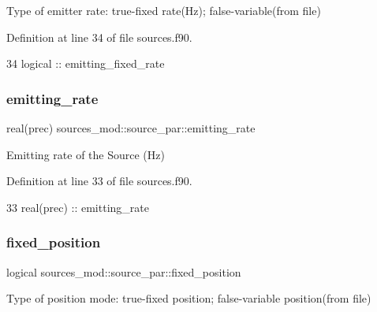 Type of emitter rate\+: true-\/fixed rate(\+Hz); false-\/variable(from file) 



Definition at line 34 of file sources.\+f90.


\begin{DoxyCode}
34         \textcolor{keywordtype}{logical} :: emitting\_fixed\_rate
\end{DoxyCode}
\mbox{\label{structsources__mod_1_1source__par_a8374d8f2d32dfa9e9f5863c7a45d0e1d}} 
\subsubsection{\texorpdfstring{emitting\+\_\+rate}{emitting\_rate}}
{\footnotesize\ttfamily real(prec) sources\+\_\+mod\+::source\+\_\+par\+::emitting\+\_\+rate\hspace{0.3cm}{\ttfamily [private]}}



Emitting rate of the Source (Hz) 



Definition at line 33 of file sources.\+f90.


\begin{DoxyCode}
33         \textcolor{keywordtype}{real(prec)} :: emitting\_rate
\end{DoxyCode}
\mbox{\label{structsources__mod_1_1source__par_a2c373733307ac5dca0f581aea21e9e03}} 
\subsubsection{\texorpdfstring{fixed\+\_\+position}{fixed\_position}}
{\footnotesize\ttfamily logical sources\+\_\+mod\+::source\+\_\+par\+::fixed\+\_\+position\hspace{0.3cm}{\ttfamily [private]}}



Type of position mode\+: true-\/fixed position; false-\/variable position(from file) 



